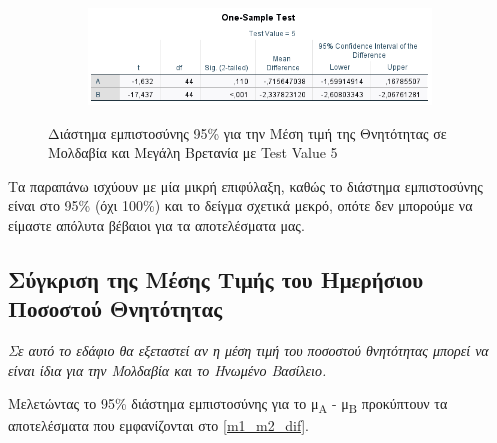 \documentclass{article}
\begin{document}
         \begin{figure}[H]
        \centering
    	\begin{adjustbox}{center}
    		\begin{subfigure}[c]{1\textwidth}    
    			\includegraphics[width=1\textwidth,height=\textheight,keepaspectratio]{media/2/percent5.png}
    		\end{subfigure}%
    	\end{adjustbox}
    	\caption{Διάστημα εμπιστοσύνης 95\% για την Μέση τιμή της Θνητότητας σε Μολδαβία και Μεγάλη Βρετανία με \foreignlanguage{english}{Test Value} 5}
        \label{percent5}
    \end{figure}
     
     \newpage
     
     Τα παραπάνω ισχύουν με μία μικρή επιφύλαξη, καθώς το διάστημα εμπιστοσύνης είναι στο 95\% (όχι 100\%) και το δείγμα σχετικά μεκρό, οπότε δεν μπορούμε να είμαστε απόλυτα βέβαιοι για τα αποτελέσματα μας.
    
\subsection{Σύγκριση της Μέσης Τιμής του Ημερήσιου Ποσοστού Θνητότητας}
    
     \emph{Σε αυτό το εδάφιο θα εξεταστεί αν η μέση τιμή του ποσοστού θνητότητας μπορεί να είναι ίδια για την 
     Μολδαβία και το Ηνωμένο Βασίλειο.}
     
     Μελετώντας το 95\% διάστημα εμπιστοσύνης για το μ\textsubscript{A} - μ\textsubscript{Β} προκύπτουν τα αποτελέσματα που εμφανίζονται στο \autoref{m1_m2_dif}.
    
\end{document}
